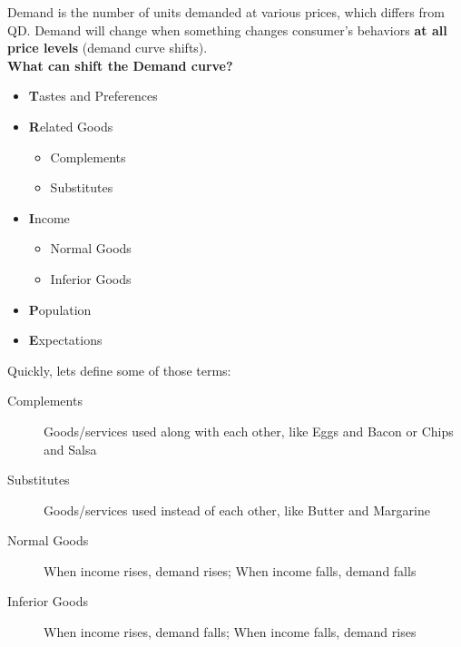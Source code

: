 Demand is the number of units demanded at various prices, which differs from QD. Demand will change when something changes consumer's behaviors \textbf{at all price levels} (demand curve shifts).\\
\textbf{What can shift the Demand curve?}
\begin{itemize}
    \item \textbf{T}astes and Preferences
    \item \textbf{R}elated Goods
        \begin{itemize}
            \item Complements
            \item Substitutes
        \end{itemize}
    \item \textbf{I}ncome
        \begin{itemize}
            \item Normal Goods
            \item Inferior Goods
        \end{itemize}
    \item \textbf{P}opulation
    \item \textbf{E}xpectations
\end{itemize}
Quickly, lets define some of those terms:
\begin{description}
\item[Complements] Goods/services used along with each other, like Eggs and Bacon or Chips and Salsa
\item[Substitutes] Goods/services used instead of each other, like Butter and Margarine
\item[Normal Goods] When income rises, demand rises; When income falls, demand falls
\item[Inferior Goods] When income rises, demand falls; When income falls, demand rises
\end{description}


